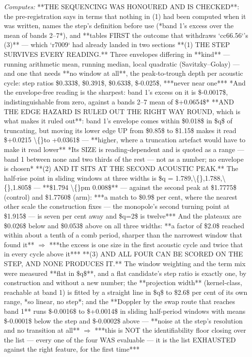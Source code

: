 \begin{description}
\emph{Computes:}  **THE SEQUENCING WAS HONOURED AND IS CHECKED**: the pre-registration says in terms that nothing in (1) had been computed when it was written, names the step's definition before use (*band 1's excess over the mean of bands 2--7*), and **tables FIRST the outcome that withdraws `cc66.56`'s (3)** --- which `r7009` had already landed in two sections   **(1) THE STEP SURVIVES EVERY READING.** Three envelopes differing in **kind** --- running arithmetic mean, running median, local quadratic (Savitzky--Golay) --- and one that needs **no window at all**, the peak-to-trough depth per acoustic cycle: step ratios \$0.333\$, \$0.391\$, \$0.633\$, \$-0.025\$, ***never near one***  *And the envelope-free reading is the sharpest: band 1's excess on it is \$-0.0017\$, indistinguishable from zero, against a bands 2--7 mean of \$+0.0654\$*   **AND THE EDGE HAZARD IS RULED OUT THE RIGHT WAY ROUND, which is what makes it ruled out**: band 1's envelope comes within \$0.018\$ in \$q\$ of truncating, but moving its lower edge UP from \$0.85\$ to \$1.15\$ makes it read \$+0.0215 \textbackslash\{\}to +0.0361\$ --- **higher, where a truncation artefact would have to make it read lower**  *Its SIZE is reading-dependent and is quoted as a range --- band 1 between none and two thirds of the rest --- not as a number; no envelope is chosen*   **(2) AND IT SITS AT THE SECOND ACOUSTIC PEAK.** The half-rise point in sliding windows at three widths is \$q = 1.789,\textbackslash\{\},1.788,\textbackslash\{\},1.805\$ --- **\$1.794 \textbackslash\{\}pm 0.008\$** --- against the second peak at \$1.7775\$ (control) and \$1.7760\$ (arm): ***a match to \$0.9\$ per cent, where the nearest other scale the construction fixes --- the monopole's second turning point at \$1.915\$ --- is seven per cent away and \$q=2\$ is twelve***  And the plateaux are \$0.026\$ below and \$0.053\$ above on all three widths: **a factor of \$2.0\$ reached within about a tenth of a comb period, sharper than the narrowest window that found it** \ensuremath{\Rightarrow} ***the excess is one size in the first acoustic cycle and twice that in every cycle above it***   **(3) AND ALL FOUR CAN BE SCORED ON THE STEP, AND NONE PRODUCES IT.** The window weighting and the term mix were measured **flat in \$q\$**, and a flat candidate's step ratio is exactly one, by construction and without a new number; the **projection width** (kernel-class, reachable at band 1) is fitted by a straight line in \$q\$ to \$2.6\$ per cent of its own range, *so linear, no step*; and the **Doppler by the swap route that reaches band 1** runs \$-0.0016\$ to \$+0.0014\$ in sliding half-period windows with means \$-0.0001\$ below the step and \$-0.0002\$ above --- **noise at the step's resolution and no transition at all** \ensuremath{\Rightarrow} ***this is NOT the identifiability floor closing over the list --- every one of the four WAS evaluable --- it is the list EXHAUSTED against the right feature, for the first time***

\end{description}

